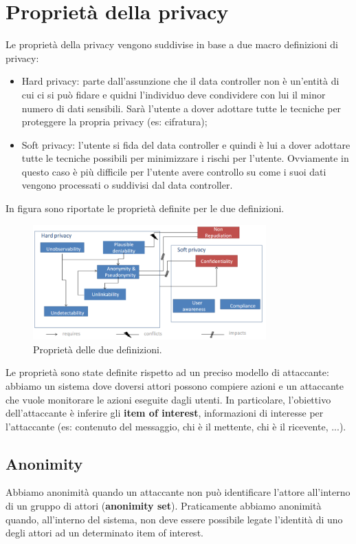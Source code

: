 \section{Proprietà della privacy}
Le proprietà della privacy vengono suddivise in base a due macro definizioni di privacy:
\begin{itemize}
    \item Hard privacy: parte dall'assunzione che il data controller non è un'entità di cui ci si può fidare e quidni l'individuo deve condividere con lui il minor numero di dati sensibili. Sarà l'utente a dover adottare tutte le tecniche per proteggere la propria privacy (es: cifratura);
    \item Soft privacy: l'utente si fida del data controller e quindi è lui a dover adottare tutte le tecniche possibili per minimizzare i rischi per l'utente. Ovviamente in questo caso è più difficile per l'utente avere controllo su come i suoi dati vengono processati o suddivisi dal data controller.
\end{itemize}

\noindent In figura sono riportate le proprietà definite per le due definizioni.

\begin{figure}
    \centering
    \includegraphics[width=0.8\textwidth]{images/12-1.png}
    \caption{Proprietà delle due definizioni.}
    \label{fig:12-1}
\end{figure}

\noindent Le proprietà sono state definite rispetto ad un preciso modello di attaccante: abbiamo un sistema dove doversi attori possono compiere azioni e un attaccante che vuole monitorare le azioni eseguite dagli utenti. In particolare, l'obiettivo dell'attaccante è inferire gli \textbf{item of interest}, informazioni di interesse per l'attaccante (es: contenuto del messaggio, chi è il mettente, chi è il ricevente, ...).

\subsection{Anonimity}
Abbiamo anonimità quando un attaccante non può identificare l'attore all'interno di un gruppo di attori (\textbf{anonimity set}). Praticamente abbiamo anonimità quando, all'interno del sistema, non deve essere possibile legate l'identità di uno degli attori ad un determinato item of interest.

